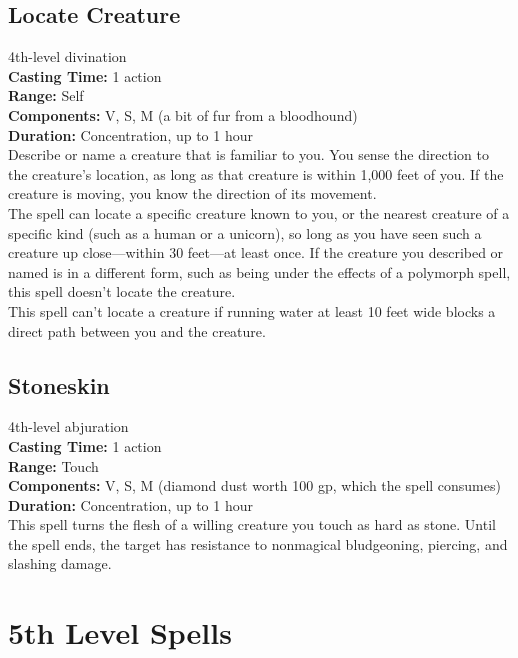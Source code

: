 \documentclass[11pt, A4paper, english]{article}
\begin{document}
		\subsection{Locate Creature}
4th-level divination \\
\textbf{Casting Time:} 1 action \\
\textbf{Range:} Self \\
\textbf{Components:} V, S, M (a bit of fur from a bloodhound) \\
\textbf{Duration:} Concentration, up to 1 hour \\
Describe or name a creature that is familiar to you. You sense the direction to the creature's location, as long as that creature is within 1,000 feet of you. If the creature is moving, you know the direction of its movement. \\
The spell can locate a specific creature known to you, or the nearest creature of a specific kind (such as a human or a unicorn), so long as you have seen such a creature up close—within 30 feet—at least once. If the creature you described or named is in a different form, such as being under the effects of a polymorph spell, this spell doesn't locate the creature. \\
This spell can’t locate a creature if running water at least 10 feet wide blocks a direct path between you and the creature.

		\subsection{Stoneskin}
4th-level abjuration \\
\textbf{Casting Time:} 1 action \\
\textbf{Range:} Touch \\
\textbf{Components:} V, S, M (diamond dust worth 100 gp, which the spell consumes) \\
\textbf{Duration:} Concentration, up to 1 hour \\
This spell turns the flesh of a willing creature you touch as hard as stone. Until the spell ends, the target has resistance to nonmagical bludgeoning, piercing, and slashing damage.



	\section{5th Level Spells}
\end{document}
